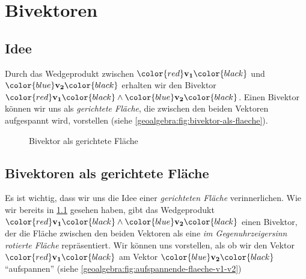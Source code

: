
\section{Bivektoren
\label{geoalgebra:section:bivektoren}}
\subsection{Idee}
\label{geoalgebra:section:bivektoren:idee}
\newcommand{\vone}{\color{red}\mathbf{v_1}\color{black}}
\newcommand{\vtwo}{\color{blue}\mathbf{v_2}\color{black}}
Durch das Wedgeprodukt zwischen $\vone$ und $\vtwo$ erhalten wir
den
Bivektor $\vone \wedge \vtwo$. Einen Bivektor können wir uns als \emph{gerichtete Fläche}, die zwischen den beiden Vektoren aufgespannt
wird, vorstellen (siehe \autoref{geoalgebra:fig:bivektor-als-flaeche}).
\begin{figure}
  \begin{center}
  \end{center}
  \caption{Bivektor als gerichtete Fläche}\label{geoalgebra:fig:bivektor-als-flaeche}
\end{figure}

\subsection{Bivektoren als gerichtete Fläche}
Es ist wichtig, dass wir uns die Idee einer \emph{gerichteten Fläche}
verinnerlichen. Wie wir bereits in \ref{geoalgebra:section:bivektoren:idee} gesehen haben,
gibt das Wedgeprodukt $\vone \wedge \vtwo$
einen Bivektor, der die Fläche zwischen den beiden Vektoren als
eine \emph{im Gegenuhrzeigersinn rotierte Fläche} repräsentiert.
Wir können uns vorstellen, als ob wir den Vektor $\vone$
am Vektor $\vtwo$ ``aufspannen'' (siehe \autoref{geoalgebra:fig:aufspannende-flaeche-v1-v2})

